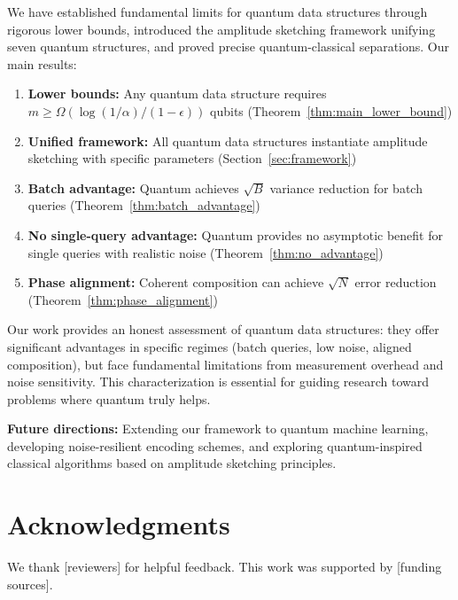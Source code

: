 \documentclass[11pt,letterpaper]{article}
\begin{document}
We have established fundamental limits for quantum data structures through rigorous lower bounds, introduced the amplitude sketching framework unifying seven quantum structures, and proved precise quantum-classical separations. Our main results:

\begin{enumerate}
\item \textbf{Lower bounds:} Any quantum data structure requires $m \geq \Omega(\log(1/\alpha)/(1-\epsilon))$ qubits (Theorem~\ref{thm:main_lower_bound})

\item \textbf{Unified framework:} All quantum data structures instantiate amplitude sketching with specific parameters (Section~\ref{sec:framework})

\item \textbf{Batch advantage:} Quantum achieves $\sqrt{B}$ variance reduction for batch queries (Theorem~\ref{thm:batch_advantage})

\item \textbf{No single-query advantage:} Quantum provides no asymptotic benefit for single queries with realistic noise (Theorem~\ref{thm:no_advantage})

\item \textbf{Phase alignment:} Coherent composition can achieve $\sqrt{N}$ error reduction (Theorem~\ref{thm:phase_alignment})
\end{enumerate}

Our work provides an honest assessment of quantum data structures: they offer significant advantages in specific regimes (batch queries, low noise, aligned composition), but face fundamental limitations from measurement overhead and noise sensitivity. This characterization is essential for guiding research toward problems where quantum truly helps.

\textbf{Future directions:} Extending our framework to quantum machine learning, developing noise-resilient encoding schemes, and exploring quantum-inspired classical algorithms based on amplitude sketching principles.

\section*{Acknowledgments}

We thank [reviewers] for helpful feedback. This work was supported by [funding sources].
\end{document}
